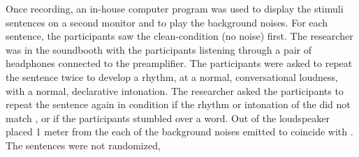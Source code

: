 Once recording, an in-house computer program was used to display the stimuli sentences on a second monitor and to play the background noises.  For each sentence, the participants saw the clean-condition (no noise) first.  The researcher was in the soundbooth with the participants listening through a pair of headphones connected to the preamplifier.  
The participants were asked to repeat the sentence twice to develop a rhythm, at a normal, conversational loudness, with a normal, declarative intonation.  \DIFaddbegin {}\DIFaddend The researcher asked the participants to repeat the sentence again in \DIFdelbegin {}\DIFdelend \DIFaddbegin {}\DIFaddend condition if the rhythm or intonation of the \DIFdelbegin {}\DIFdelend \DIFaddbegin {}\DIFaddend did not match \DIFaddbegin {}\DIFaddend , or if the participants stumbled over a word.  \DIFdelbegin {}\DIFdelend Out of the loudspeaker \DIFdelbegin \DIFdel{, }\DIFdelend \DIFaddbegin \DIFadd{- }\DIFaddend placed 1 meter from the \DIFdelbegin {}\DIFdelend \DIFaddbegin {}\DIFaddend each of the background noises \DIFdelbegin {}\DIFdelend \DIFaddbegin {}\DIFaddend emitted to coincide with \DIFdelbegin {}\DIFdelend \DIFaddbegin {}\DIFaddend .  The sentences were not randomized, 
